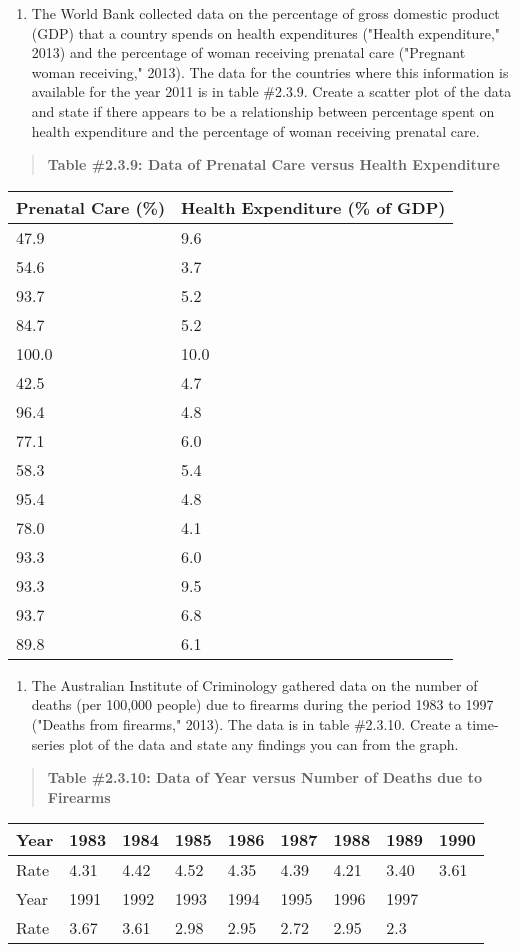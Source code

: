 \documentclass[]{book}
\providecommand{\tightlist}{%
  \setlength{\itemsep}{0pt}\setlength{\parskip}{0pt}}
\begin{document}
\begin{enumerate}
\def\labelenumi{\arabic{enumi}.}
\setcounter{enumi}{5}
\tightlist
\item
  The World Bank collected data on the percentage of gross domestic
  product (GDP) that a country spends on health expenditures ("Health
  expenditure," 2013) and the percentage of woman receiving prenatal
  care ("Pregnant woman receiving," 2013). The data for the
  countries where this information is available for the year 2011 is
  in table \#2.3.9. Create a scatter plot of the data and state if
  there appears to be a relationship between percentage spent on
  health expenditure and the percentage of woman receiving prenatal
  care.
\end{enumerate}

\begin{quote}
\textbf{Table \#2.3.9: Data of Prenatal Care versus Health Expenditure}
\end{quote}

\begin{longtable}[]{@{}ll@{}}
\toprule
Prenatal Care (\%) & Health Expenditure (\% of GDP)\tabularnewline
\midrule
\endhead
47.9 & 9.6\tabularnewline
54.6 & 3.7\tabularnewline
93.7 & 5.2\tabularnewline
84.7 & 5.2\tabularnewline
100.0 & 10.0\tabularnewline
42.5 & 4.7\tabularnewline
96.4 & 4.8\tabularnewline
77.1 & 6.0\tabularnewline
58.3 & 5.4\tabularnewline
95.4 & 4.8\tabularnewline
78.0 & 4.1\tabularnewline
93.3 & 6.0\tabularnewline
93.3 & 9.5\tabularnewline
93.7 & 6.8\tabularnewline
89.8 & 6.1\tabularnewline
\bottomrule
\end{longtable}

\begin{enumerate}
\def\labelenumi{\arabic{enumi}.}
\setcounter{enumi}{6}
\tightlist
\item
  The Australian Institute of Criminology gathered data on the number
  of deaths (per 100,000 people) due to firearms during the period
  1983 to 1997 ("Deaths from firearms," 2013). The data is in table
  \#2.3.10. Create a time-series plot of the data and state any
  findings you can from the graph.
\end{enumerate}

\begin{quote}
\textbf{Table \#2.3.10: Data of Year versus Number of Deaths due to
Firearms}
\end{quote}

\begin{longtable}[]{@{}lllllllll@{}}
\toprule
Year & 1983 & 1984 & 1985 & 1986 & 1987 & 1988 & 1989 & 1990\tabularnewline
\midrule
\endhead
Rate & 4.31 & 4.42 & 4.52 & 4.35 & 4.39 & 4.21 & 3.40 & 3.61\tabularnewline
Year & 1991 & 1992 & 1993 & 1994 & 1995 & 1996 & 1997 &\tabularnewline
Rate & 3.67 & 3.61 & 2.98 & 2.95 & 2.72 & 2.95 & 2.3 &\tabularnewline
\bottomrule
\end{longtable}
\end{document}
